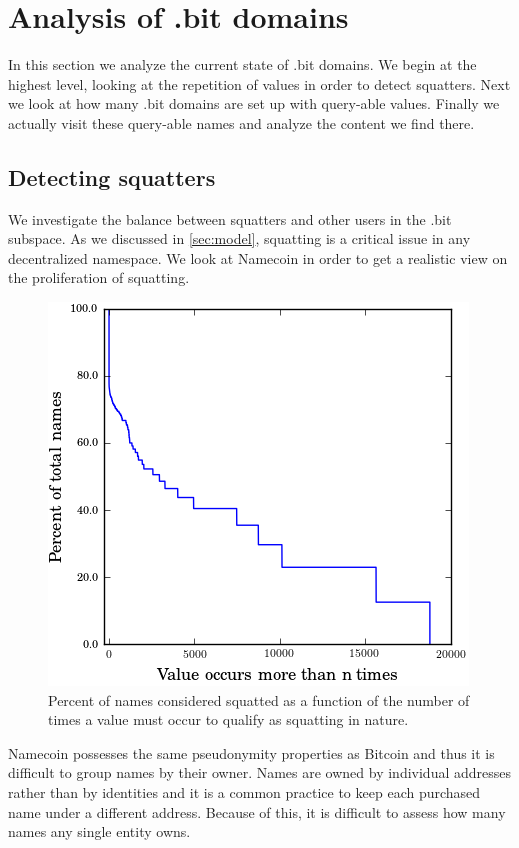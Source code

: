 \section{Analysis of .bit domains}
\label{sec:domains}

In this section we analyze the current state of .bit domains. We begin at the highest level, looking at the repetition of values in order to detect squatters. Next we look at how many .bit domains are set up with query-able values. Finally we actually visit these query-able names and analyze the content we find there.

\subsection{Detecting squatters}

We investigate the balance between squatters and other users in the .bit subspace. As we discussed in \ref{sec:model}, squatting is a critical issue in any decentralized namespace. We look at Namecoin in order to get a realistic view on the proliferation of squatting.

\begin{figure}
  \centering
  \includegraphics[width=0.9\columnwidth]{figures/squatters}
  \caption{Percent of names considered squatted as a function of the number of times a value must occur to qualify as squatting in nature.}
  \label{fig:percentSquatter}
\end{figure}

Namecoin possesses the same pseudonymity properties as Bitcoin and thus it is difficult to group names by their owner. Names are owned by individual addresses rather than by identities and it is a common practice to keep each purchased name under a different address. Because of this, it is difficult to assess how many names any single entity owns. 

